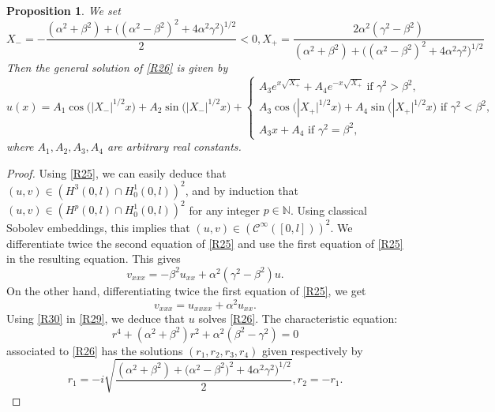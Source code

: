 \documentclass[10pt, english]{article}
\newtheorem{prop}[thm]{Proposition}
\begin{document}
{\begin{prop}
We set 
\begin{equation}\label{R27}%
X_-=-\dfrac{(\alpha^2+\beta^2) + \big((\alpha^2-\beta^2)^2 +4 \alpha^2 \gamma^2\big)^{1/2}}{2} <0,
X_+=\dfrac{2\alpha^2(\gamma^2-\beta^2)}{(\alpha^2+\beta^2) + \big((\alpha^2-\beta^2)^2 +4 \alpha^2 \gamma^2\big)^{1/2}}
\end{equation}
Then the general solution of \eqref{R26} is given by
\begin{equation}\label{R28}%
u(x)=A_1\cos\big(\big|X_-\big|^{1/2}x\big)+A_2\sin\big(\big|X_-\big|^{1/2}x\big) + \begin{cases}
A_3e^{x\sqrt{X_+}}+A_4 e^{-x\sqrt{X_+}}\mbox{ if } \gamma^2 > \beta^2,\\
A_3\cos\big(|X_+\big|^{1/2}x\big) + A_4\sin\big(|X_+\big|^{1/2}x\big) \mbox{ if } \gamma^2 < \beta^2,\\
A_3x+A_4 \mbox{ if } \gamma^2 = \beta^2,
\end{cases}
\end{equation}
where $A_1, A_2, A_3, A_4$ are arbitrary real constants. 
\end{prop}
\begin{proof}
Using \eqref{R25}, we can easily deduce that $(u,v) \in (H^3(0,l) \cap H^1_0(0,l))^2$, and by induction that $(u,v) \in (H^p(0,l) \cap H^1_0(0,l))^2$ for any integer $p \in \mathbb{N}$. Using classical Sobolev embeddings, this implies that $(u,v) \in (\mathcal{C}^{\infty}([0,l]))^2$.
We differentiate twice the second equation of \eqref{R25} and use the first equation of \eqref{R25} in the resulting equation. This gives
\begin{equation}\label{R29}%
v_{xxx}=-\beta^2u_{xx} +\alpha^2(\gamma^2-\beta^2)u.
\end{equation}
On the other hand, differentiating twice the first equation of \eqref{R25}, we get 
\begin{equation}\label{R30}%
v_{xxx}=u_{xxxx} +\alpha^2u_{xx}.
\end{equation}
Using \eqref{R30} in \eqref{R29}, we deduce that $u$ solves \eqref{R26}.
The characteristic equation:
\begin{equation}\label{R31}%
r^4 + (\alpha^2+\beta^2)r^2 + \alpha^2(\beta^2 - \gamma^2)=0
\end{equation}
associated to \eqref{R26} has the solutions $(r_1,r_2,r_3,r_4)$ given respectively by
\begin{equation}\label{R32}%
r_1=-i\sqrt{\dfrac{(\alpha^2+\beta^2)+ \big(\alpha^2-\beta^2)^2 +4 \alpha^2 \gamma^2\big)^{1/2}}{2}}, r_2=-r_1.

\end{equation}
\end{proof}}
\end{document}
